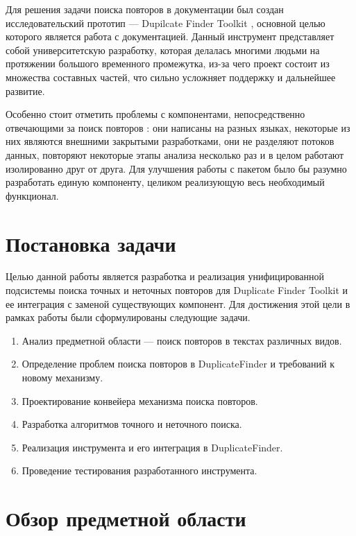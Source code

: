 \documentclass[14pt]{matmex-diploma-custom}
\begin{document}
Для решения задачи поиска повторов в документации был создан исследовательский прототип --- Dupilcate Finder Toolkit \cite{bib:tool:DuplicateFinder}, основной целью которого является работа с документацией. Данный инструмент представляет собой университетскую разработку, которая делалась многими людьми на протяжении большого временного промежутка, из-за чего проект состоит из множества составных частей, что сильно усложняет поддержку и дальнейшее развитие.

Особенно стоит отметить проблемы с компонентами, непосредственно отвечающими за поиск повторов \cite{bib:tool:CloneMiner, bib:tool:FuzzySearch, bib:tool:ImprovedNgramSearch}: они написаны на разных языках, некоторые из них являются внешними закрытыми разработками, они не разделяют потоков данных, повторяют некоторые этапы анализа несколько раз и в целом работают изолированно друг от друга. Для улучшения работы с пакетом было бы разумно разработать единую компоненту, целиком реализующую весь необходимый функционал.

\section{Постановка задачи}
Целью данной работы является разработка и реализация унифицированной подсистемы поиска точных и неточных повторов для Duplicate Finder Toolkit и ее интеграция с заменой существующих компонент. Для достижения этой цели в рамках работы были сформулированы следующие задачи.

\begin{enumerate}
	\item Анализ предметной области --- поиск повторов в текстах различных видов.
	\item Определение проблем поиска повторов в DuplicateFinder и требований к новому механизму.
	\item Проектирование конвейера механизма поиска повторов.
	\item Разработка алгоритмов точного и неточного поиска.
	\item Реализация инструмента и его интеграция в DuplicateFinder.
	\item Проведение тестирования разработанного инструмента.
\end{enumerate}

\section{Обзор предметной области}
\end{document}
